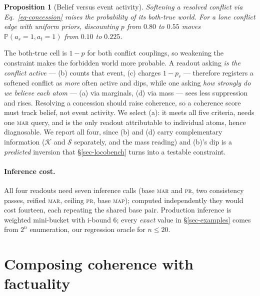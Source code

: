 \documentclass{article} %
\newtheorem{proposition}{Proposition}
\newcommand{\pr}[1]{\mathbb{P}\!\left( #1 \right)}
\begin{document}
\begin{proposition}[Belief versus event activity]
\label{prop-quirk}
Softening a resolved conflict via Eq.~\ref{eq-concession} \emph{raises} the probability of
its both-true world. For a lone conflict edge with uniform priors, discounting $p$ from
$0.80$ to $0.55$ moves $\pr{a_s{=}1,a_t{=}1}$ from $0.10$ to $0.225$.
\end{proposition}

The both-true cell is $1-p$ for both conflict couplings, so weakening the constraint makes the
forbidden world more probable. A readout asking \emph{is the conflict active} --- (b) counts that
event, (c) charges $1-p_r$ --- therefore registers a softened conflict as \emph{more} often
active and dips, while one asking \emph{how strongly do we believe each atom} --- (a) via
marginals, (d) via mass --- sees less suppression and rises. Resolving a concession should raise
coherence, so a coherence score must track belief, not event activity. We select (a): it meets
all five criteria, needs one \textsc{mar} query, and is the only readout attributable to
individual atoms, hence diagnosable. We report all four, since (b) and (d) carry complementary
information ($\mathcal{K}$ and $\mathcal{S}$ separately, and the mass reading) and (b)'s dip is
a \emph{predicted} inversion that \S\ref{sec-locobench} turns into a testable constraint.

\paragraph{Inference cost.} All four readouts need seven inference calls (base \textsc{mar} and
\textsc{pr}, two consistency passes, reified \textsc{mar}, ceiling \textsc{pr}, base
\textsc{map}); computed independently they would cost fourteen, each repeating the shared base
pair. Production inference is weighted mini-bucket \citep{wmb} with i-bound $6$; every
\emph{exact} value in \S\ref{sec-examples} comes from $2^n$ enumeration, our regression oracle
for $n\le20$.

\section{Composing coherence with factuality}
\label{sec-twostage}
\end{document}
